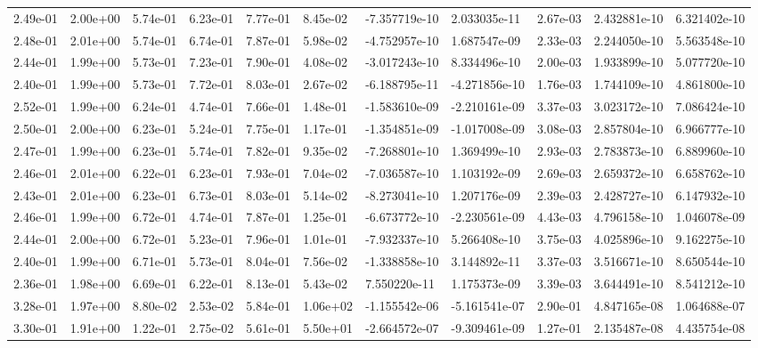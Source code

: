 \begin{longtable}{| p{} | p{} |}
2.49e-01 & 2.00e+00 & 5.74e-01 & 6.23e-01 & 7.77e-01 & 8.45e-02 & -7.357719e-10 &  2.033035e-11 &  2.67e-03 &  2.432881e-10 &  6.321402e-10 \\
2.48e-01 & 2.01e+00 & 5.74e-01 & 6.74e-01 & 7.87e-01 & 5.98e-02 & -4.752957e-10 &  1.687547e-09 &  2.33e-03 &  2.244050e-10 &  5.563548e-10 \\
2.44e-01 & 1.99e+00 & 5.73e-01 & 7.23e-01 & 7.90e-01 & 4.08e-02 & -3.017243e-10 &  8.334496e-10 &  2.00e-03 &  1.933899e-10 &  5.077720e-10 \\
2.40e-01 & 1.99e+00 & 5.73e-01 & 7.72e-01 & 8.03e-01 & 2.67e-02 & -6.188795e-11 & -4.271856e-10 &  1.76e-03 &  1.744109e-10 &  4.861800e-10 \\
2.52e-01 & 1.99e+00 & 6.24e-01 & 4.74e-01 & 7.66e-01 & 1.48e-01 & -1.583610e-09 & -2.210161e-09 &  3.37e-03 &  3.023172e-10 &  7.086424e-10 \\
2.50e-01 & 2.00e+00 & 6.23e-01 & 5.24e-01 & 7.75e-01 & 1.17e-01 & -1.354851e-09 & -1.017008e-09 &  3.08e-03 &  2.857804e-10 &  6.966777e-10 \\
2.47e-01 & 1.99e+00 & 6.23e-01 & 5.74e-01 & 7.82e-01 & 9.35e-02 & -7.268801e-10 &  1.369499e-10 &  2.93e-03 &  2.783873e-10 &  6.889960e-10 \\
2.46e-01 & 2.01e+00 & 6.22e-01 & 6.23e-01 & 7.93e-01 & 7.04e-02 & -7.036587e-10 &  1.103192e-09 &  2.69e-03 &  2.659372e-10 &  6.658762e-10 \\
2.43e-01 & 2.01e+00 & 6.23e-01 & 6.73e-01 & 8.03e-01 & 5.14e-02 & -8.273041e-10 &  1.207176e-09 &  2.39e-03 &  2.428727e-10 &  6.147932e-10 \\
2.46e-01 & 1.99e+00 & 6.72e-01 & 4.74e-01 & 7.87e-01 & 1.25e-01 & -6.673772e-10 & -2.230561e-09 &  4.43e-03 &  4.796158e-10 &  1.046078e-09 \\
2.44e-01 & 2.00e+00 & 6.72e-01 & 5.23e-01 & 7.96e-01 & 1.01e-01 & -7.932337e-10 &  5.266408e-10 &  3.75e-03 &  4.025896e-10 &  9.162275e-10 \\
2.40e-01 & 1.99e+00 & 6.71e-01 & 5.73e-01 & 8.04e-01 & 7.56e-02 & -1.338858e-10 &  3.144892e-11 &  3.37e-03 &  3.516671e-10 &  8.650544e-10 \\
2.36e-01 & 1.98e+00 & 6.69e-01 & 6.22e-01 & 8.13e-01 & 5.43e-02 &  7.550220e-11 &  1.175373e-09 &  3.39e-03 &  3.644491e-10 &  8.541212e-10 \\
3.28e-01 & 1.97e+00 & 8.80e-02 & 2.53e-02 & 5.84e-01 & 1.06e+02 & -1.155542e-06 & -5.161541e-07 &  2.90e-01 &  4.847165e-08 &  1.064688e-07 \\
3.30e-01 & 1.91e+00 & 1.22e-01 & 2.75e-02 & 5.61e-01 & 5.50e+01 & -2.664572e-07 & -9.309461e-09 &  1.27e-01 &  2.135487e-08 &  4.435754e-08 \\

\end{longtable}
